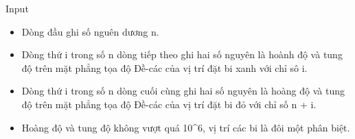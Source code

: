 Input
\begin{itemize}
	\item Dòng đầu ghi số nguên dương n.
	\item Dòng thứ i trong số n dòng tiếp theo ghi hai số nguyên là hoành độ và tung độ trên mặt phẳng tọa độ Đề-các của vị trí đặt bi xanh với chỉ sô i.
	\item Dòng thứ i trong số n dòng cuối cùng ghi hai số nguyên là hoàng độ và tung độ trên mặt phẳng tọa độ Đề-các của vị trí đặt bi đỏ với chỉ số n + i.
	\item Hoàng độ và tung độ không vượt quá 10^6, vị trí các bi là đôi một phân biệt.
\end{itemize}